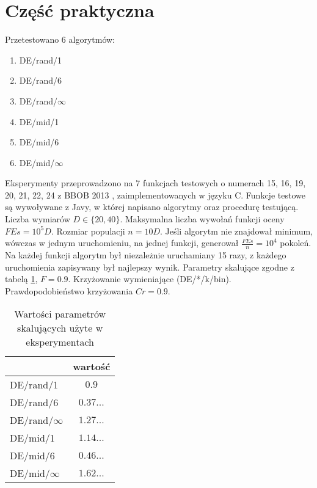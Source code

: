 \documentclass[12pt, a4paper]{article}
\begin{document}
\section{Część praktyczna}

Przetestowano 6 algorytmów:
\begin{enumerate}
 \item DE/rand/1
 \item DE/rand/6
 \item DE/rand/$\infty$ 
 \item DE/mid/1 
 \item DE/mid/6 
 \item DE/mid/$\infty$ 
\end{enumerate}

Eksperymenty przeprowadzono na 7 funkcjach testowych o numerach 15, 16, 19, 20, 21, 22, 24 z BBOB 2013 \cite{finck}, zaimplementowanych w języku C.
Funkcje testowe są wywoływane z Javy, w której napisano algorytmy oraz procedurę testującą.
Liczba wymiarów $D \in \{20, 40\}$. Maksymalna liczba wywołań funkcji oceny $FEs = 10^5D$. Rozmiar populacji $n = 10D$. 
Jeśli algorytm nie znajdował minimum, wówczas w jednym uruchomieniu, na jednej funkcji, generował $\frac{FEs}{n} = 10^4$ pokoleń.
Na każdej funkcji algorytm był niezależnie uruchamiany 15 razy, z każdego uruchomienia zapisywany był najlepszy wynik.
Parametry skalujące zgodne z tabelą \ref{table:parametry_liczbowe}, $F = 0.9$. Krzyżowanie wymieniające (DE/*/k/bin).
Prawdopodobieństwo krzyżowania $Cr = 0.9$. \\

\begin{table}[H]
\centering
\begin{tabular}{ l | c }
                 & wartość \\ \hline
DE/rand/1        & $0.9$ \\ 
DE/rand/6        & $0.37...$ \\ 
DE/rand/$\infty$ & $1.27...$ \\ 
DE/mid/1         & $1.14...$ \\
DE/mid/6         & $0.46...$ \\
DE/mid/$\infty$  & $1.62...$ \\
\end{tabular}
\caption{Wartości parametrów skalujących użyte w eksperymentach}
\label{table:parametry_liczbowe}
\end{table}
\end{document}
